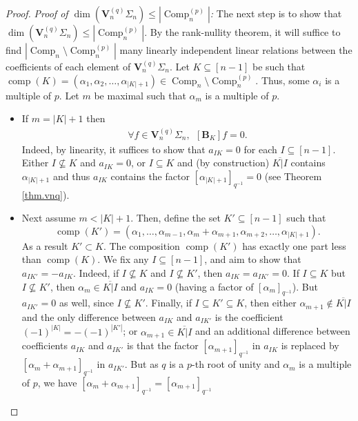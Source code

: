 \documentclass[10pt,a4paper]{amsart}
\newcommand{\BB}{\mathbf{B}} %
\newcommand{\Comp}{\operatorname{Comp}}
\newcommand{\comp}{\operatorname{comp}}
\begin{document}
\begin{proof}
\textit{Proof of $\dim\left(\mathbf{V}_n^{(q)}\Sigma_n\right) \leq |\Comp_n^{(p)}|$:}
The next step is to show that $\dim\left(\mathbf{V}_n^{(q)}\Sigma_n\right) \leq |\Comp_n^{(p)}|$.
By the rank-nullity theorem, it will suffice to find $|\Comp_n \setminus \Comp_n^{(p)}|$ many linearly independent linear relations between the coefficients of each element of $\mathbf{V}_n^{(q)}\Sigma_n$.
Let $K \subseteq [n-1]$ be such that $\comp(K) = (\alpha_1, \alpha_2, \dots, \alpha_{|K|+1}) \in \Comp_n \setminus \Comp_n^{(p)}$.
Thus, some $\alpha_i$ is a multiple of $p$.
Let $m$ be maximal such that $\alpha_m$ is a multiple of $p$. 
\begin{itemize}
\item[(a)] If $m=|K|+1$ then
\begin{align}
\label{eq.linrel0q.1}
\forall f \in \mathbf{V}_n^{(q)}\Sigma_n, \ \ [\BB_K]f = 0.
\end{align}
Indeed, by linearity, it suffices to show that $a_{IK} = 0$ for each $I \subseteq [n-1]$. Either $I \nsubseteq K$ and $a_{IK} = 0$, or $I \subseteq K$ and (by construction) $\overline{K|I}$ contains $\alpha_{|K|+1}$ and thus $a_{IK}$ contains the factor $[\alpha_{|K|+1}]_{q^{-1}} = 0$ (see Theorem \ref{thm.vnq}). 
\item[(b)] Next assume $m < |K|+1$.
Then, define the set $K' \subseteq [n-1]$ such that 
\[
\comp(K') = (\alpha_1, \dots, \alpha_{m-1}, \alpha_m + \alpha_{m+1}, \alpha_{m+2},\dots, \alpha_{|K|+1}).
\]
As a result $K' \subset K$. The composition $\comp(K')$ has exactly one part less than $\comp(K)$.
We fix any $I \subseteq [n-1]$, and aim to show that $a_{IK'} = - a_{IK}$.
Indeed, if $I \nsubseteq K$ and $I \nsubseteq K'$, then $a_{IK}=a_{IK'}=0$. If $I \subseteq K$ but $I \nsubseteq K'$, then $\alpha_m \in \overline{K|I}$ and $a_{IK} = 0$ (having a factor of $[\alpha_m]_{q^{-1}}$). But $a_{IK'} =0$ as well, since $I \nsubseteq K'$.
Finally, if $I \subseteq K' \subseteq K$, then either $\alpha_{m+1} \notin \overline{K|I}$ and the only difference between $a_{IK}$ and $a_{IK'}$ is the coefficient $(-1)^{|K|} = - (-1)^{|K'|}$; or $\alpha_{m+1} \in \overline{K|I}$ and an additional difference between coefficients $a_{IK}$ and $a_{IK'}$ is that the factor $[\alpha_{m+1}]_{q^{-1}}$ in $a_{IK}$ is replaced by $[\alpha_{m}+\alpha_{m+1}]_{q^{-1}}$ in $a_{IK'}$. But as $q$ is a $p$-th root of unity and $\alpha_{m}$ is a multiple of $p$,
we have $[\alpha_{m}+\alpha_{m+1}]_{q^{-1}} = [\alpha_{m+1}]_{q^{-1}}$

\end{itemize}
\end{proof}
\end{document}
